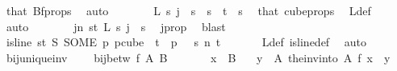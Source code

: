 \begin{isabellebody}
\ that\ Bf{\isacharunderscore}{\kern0pt}props\ \isamarkupfalse%
\ auto\isanewline
\ \ \ \ \isamarkupfalse%
\ \isamarkupfalse%
\ {\isachardoublequoteopen}L\ s\ j\ {\isacharequal}{\kern0pt}\ s{\isachardoublequoteclose}\ \ {\isachardoublequoteopen}s\ {\isacharless}{\kern0pt}\ t{\isachardoublequoteclose}\ \ s\ \isamarkupfalse%
\ that\ cube{\isacharunderscore}{\kern0pt}props{\isacharparenleft}{\kern0pt}{}{\isacharcomma}{\kern0pt}{}{\isacharparenright}{\kern0pt}\ \isamarkupfalse%
\ L{\isacharunderscore}{\kern0pt}def\ \isamarkupfalse%
\ auto\isanewline
\ \ \ \ \isamarkupfalse%
\ \isamarkupfalse%
\ {\isachardoublequoteopen}{\isasymexists}j{\isacharless}{\kern0pt}n{\isachardot}{\kern0pt}\ {\isasymforall}s{\isacharless}{\kern0pt}t{\isachardot}{\kern0pt}\ {\isacharparenleft}{\kern0pt}L\ s\ j\ {\isacharequal}{\kern0pt}\ s{\isacharparenright}{\kern0pt}{\isachardoublequoteclose}\ \isamarkupfalse%
\ j{\isacharunderscore}{\kern0pt}prop\ \isamarkupfalse%
\ blast\isanewline
\ \ \isamarkupfalse%
\isanewline
\ \ \isamarkupfalse%
\ \isamarkupfalse%
\ {\isachardoublequoteopen}is{\isacharunderscore}{\kern0pt}line\ {\isacharparenleft}{\kern0pt}{\isasymlambda}s{\isasymin}{\isacharbraceleft}{\kern0pt}{\isachardot}{\kern0pt}{\isachardot}{\kern0pt}{\isacharless}{\kern0pt}t{\isacharbraceright}{\kern0pt}{\isachardot}{\kern0pt}\ S\ {\isacharparenleft}{\kern0pt}SOME\ p{\isachardot}{\kern0pt}\ p{\isasymin}cube\ {}\ t\ {\isasymand}\ p\ {}\ {\isacharequal}{\kern0pt}\ s{\isacharparenright}{\kern0pt}{\isacharparenright}{\kern0pt}\ n\ t{\isachardoublequoteclose}\ \isanewline
\ \ \ \ \isamarkupfalse%
\ L{\isacharunderscore}{\kern0pt}def\ is{\isacharunderscore}{\kern0pt}line{\isacharunderscore}{\kern0pt}def\ \isamarkupfalse%
\ auto\isanewline
{}\isamarkupfalse%
%
\endisatagproof
{\isafoldproof}%
%
\isadelimproof
\isanewline
%
\endisadelimproof
\isanewline
{}\isamarkupfalse%
\ bij{\isacharunderscore}{\kern0pt}unique{\isacharunderscore}{\kern0pt}inv{\isacharcolon}{\kern0pt}\ \isanewline
\ \ \ {\isachardoublequoteopen}bij{\isacharunderscore}{\kern0pt}betw\ f\ A\ B{\isachardoublequoteclose}\ \ \isanewline
\ \ \ \ \ {\isachardoublequoteopen}x\ {\isasymin}\ B{\isachardoublequoteclose}\isanewline
\ \ \ {\isachardoublequoteopen}{\isasymexists}{\isacharbang}{\kern0pt}y\ {\isasymin}\ A{\isachardot}{\kern0pt}\ {\isacharparenleft}{\kern0pt}the{\isacharunderscore}{\kern0pt}inv{\isacharunderscore}{\kern0pt}into\ A\ f{\isacharparenright}{\kern0pt}\ x\ {\isacharequal}{\kern0pt}\ y{\isachardoublequoteclose}\ \isanewline

\end{isabellebody}
